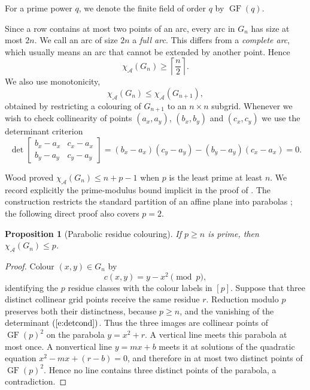 \documentclass[11pt]{article}
\newtheorem{proposition}[theorem]{Proposition}
\theoremstyle{definition}
\theoremstyle{remark}
\newcommand{\GF}{\operatorname{GF}}
\renewcommand{\ge}{\geqslant}
\renewcommand{\le}{\leqslant}
\begin{document}
For a prime power \(q\), we denote the finite field of order \(q\) by
\(\GF(q)\).

Since a row contains at most two points of an arc, every arc in \(G_n\) has
size at most \(2n\).  We call an arc of size \(2n\) a \emph{full arc}.
This differs from a \emph{complete arc}, which usually means an arc that
cannot be extended by another point.  Hence
\begin{equation}\label{eq:row-lower}
  \chi_{\mathcal{A}}(G_n)\ge \left\lceil\frac n2\right\rceil.
\end{equation}
We also use monotonicity,
\[
  \chi_{\mathcal{A}}(G_n)\le \chi_{\mathcal{A}}(G_{n+1}),
\]
obtained by restricting a colouring of \(G_{n+1}\) to an \(n\times n\)
subgrid.
Whenever we wish to check collinearity of points 
$(a_x,a_y)$, $(b_x,b_y)$ and $(c_x,c_y)$ we use the determinant criterion
\begin{equation}\label{e:detcond}
\det\left[\begin{array}{cc}
   b_x-a_x  & c_x-a_x \\
b_y-a_y & c_y-a_y
\end{array}\right]=
 (b_x-a_x)(c_y-a_y)-(b_y-a_y)(c_x-a_x)=0.
\end{equation}

Wood \cite{Wood2004} proved \(\chi_{\mathcal{A}}(G_n)\le n+p-1\) when \(p\) is the least prime at least
\(n\).  We record explicitly the prime-modulus bound implicit in the proof of
\cite[Proposition~5.1]{AraujoMartinez2026}.  The construction restricts the
standard partition of an affine plane into parabolas
\cite{CsimaFuredi1986}; the following direct proof also covers \(p=2\).

\begin{proposition}[Parabolic residue colouring]\label{prop:parabola}
If \(p\ge n\) is prime, then \(\chi_{\mathcal{A}}(G_n)\le p\).
\end{proposition}

\begin{proof}
Colour \((x,y)\in G_n\) by
\[
  c(x,y)=y-x^2\pmod p,
\]
identifying the \(p\) residue classes with the colour labels in \([p]\).
Suppose that three distinct collinear grid points receive the same residue
\(r\).  Reduction modulo \(p\) preserves both their distinctness, because
\(p\ge n\), and the vanishing of the determinant $(\ref{e:detcond})$.  Thus
the three images are collinear points of \(\GF(p)^2\) on the parabola
\(y=x^2+r\).  A vertical line meets this parabola at most once.  A nonvertical line
\(y=mx+b\) meets it at solutions of the quadratic equation
\(x^2-mx+(r-b)=0\), and therefore in at most two distinct points of
\(\GF(p)^2\).  Hence no line contains three distinct points of the parabola,
a contradiction.
\end{proof}
\end{document}
